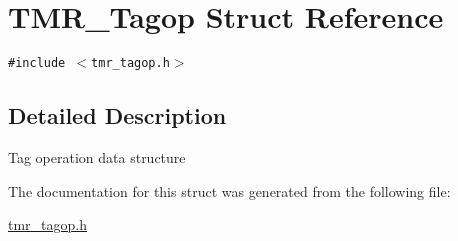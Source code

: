 \hypertarget{struct_t_m_r___tagop}{
\section{TMR\_\-Tagop Struct Reference}
\label{struct_t_m_r___tagop}
}
{\tt \#include $<$tmr\_\-tagop.h$>$}



\subsection{Detailed Description}
Tag operation data structure 

The documentation for this struct was generated from the following file:\begin{CompactItemize}
\item 
\hyperlink{tmr__tagop_8h}{tmr\_\-tagop.h}\end{CompactItemize}
